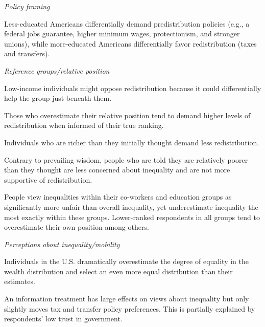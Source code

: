 \documentclass{article}
\newcommand{\citem}[1]{\medskip \noindent \textbf{\cite*{#1}}}
\newcommand{\textm}[1]{\medskip \noindent \textit{#1}}
\begin{document}
\textm{Policy framing}

\citem{kuziemko2023compensate}

Less-educated Americans differentially demand predistribution policies (e.g., a federal jobs guarantee, higher minimum wages, protectionism, and stronger unions), while more-educated Americans differentially favor redistribution (taxes and transfers).

\textm{Reference groups/relative position}

\citem{kuziemko2014last}

Low-income individuals might oppose redistribution because it could differentially help the group just beneath them.

\citem{cruces2013biased}

Those who overestimate their relative position tend to demand higher levels of redistribution when informed of their true ranking.

\citem{karadja2017richer}

Individuals who are richer than they initially thought demand less redistribution.

\citem{hoy2021relatively}

Contrary to prevailing wisdom, people who are told they are relatively poorer than they thought are less concerned about inequality and are not more supportive of redistribution. 

\citem{hvidberg2023social}

People view inequalities within their co-workers and education groups as significantly more unfair than overall inequality, yet underestimate inequality the most exactly within these groups. Lower-ranked respondents in all groups tend to overestimate their own position among others.

\textm{Perceptions about inequality/mobility}

\citem{norton2011building}

Individuals in the U.S. dramatically overestimate the degree of equality in the wealth distribution and select an even more equal distribution than their estimates.

\citem{kuziemko2015elastic} 

An information treatment has large effects on views about inequality but only slightly moves tax and transfer policy preferences. This is partially explained by respondents’ low trust in government.
\end{document}
